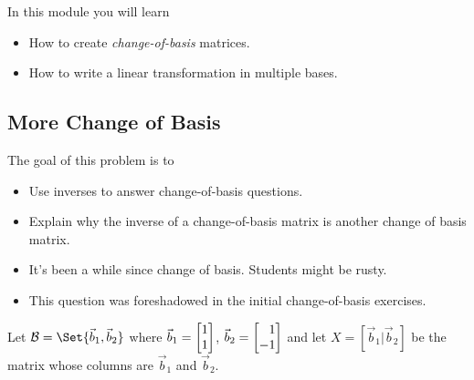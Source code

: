 \begin{module}

	In this module you will learn
	\begin{itemize}
		\item How to create \emph{change-of-basis} matrices.
		\item How to write a linear transformation in multiple bases.
	\end{itemize}

	
	
\end{module}
	\bookonlynewpage
\subsection*{More Change of Basis}
	\question
	\begin{annotation}
		\begin{goals}

			The goal of this problem is to
			\begin{itemize}
				\item Use inverses to answer change-of-basis questions.
				\item Explain why the inverse of a change-of-basis matrix is another
					change of basis matrix.
			\end{itemize}
		\end{goals}

		\begin{notes}
			\begin{itemize}
				\item It's been a while since change of basis. Students might be rusty.
				\item This question was foreshadowed in the initial change-of-basis exercises.
			\end{itemize}
		\end{notes}
	\end{annotation}
	Let $\mathcal B=\Set{\vec b_1,\vec b_2}$ where $\vec b_1=\mat{1\\1}$, $\vec b_2=\mat{1\\-1}$
	and let $X=[\vec b_1|\vec b_2]$ be the matrix whose columns are $\vec b_1$ and $\vec b_2$.
